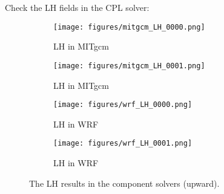 
Check the LH fields in the CPL solver:

\begin{figure}[h!]
\centering
  \begin{subfigure}[b]{0.45\linewidth}
  \texttt{[image: figures/mitgcm\_LH\_0000.png]}
  \caption{LH in MITgcm}
  \end{subfigure}
  \begin{subfigure}[b]{0.45\linewidth}
  \texttt{[image: figures/mitgcm\_LH\_0001.png]}
  \caption{LH in MITgcm}
  \end{subfigure}
  \hspace{0.1in}
  \begin{subfigure}[b]{0.45\linewidth}
  \texttt{[image: figures/wrf\_LH\_0000.png]}
  \caption{LH in WRF}
  \end{subfigure}
  \begin{subfigure}[b]{0.45\linewidth}
  \texttt{[image: figures/wrf\_LH\_0001.png]}
  \caption{LH in WRF}
  \end{subfigure}
\caption{The LH results in the component solvers (upward).}
\label{fig:lh}
\end{figure}
